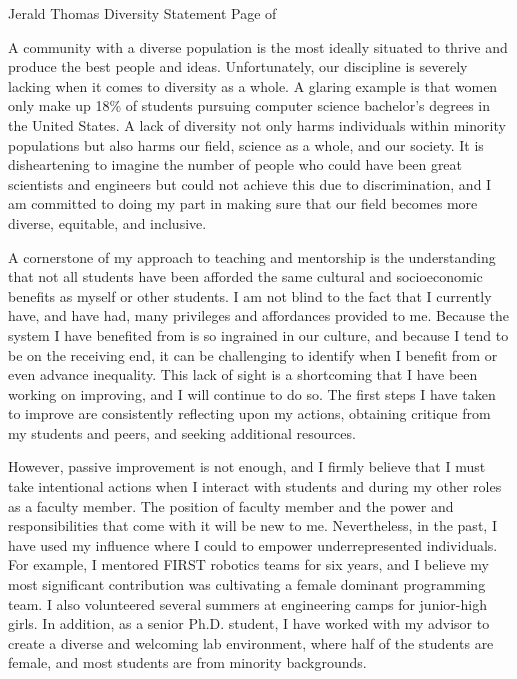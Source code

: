 \newpage

\setcounter{page}{1}
\makecvfooter
  {Jerald Thomas}
  {Diversity Statement}
  {Page \thepage \hspace{1pt} of \pageref{diversity_last}}

\makecvheader[C]
\doublespacing


A community with a diverse population is the most ideally situated to thrive and produce the best people and ideas. Unfortunately, our discipline is severely lacking when it comes to diversity as a whole. A glaring example is that women only make up 18\% of students pursuing computer science bachelor's degrees in the United States. A lack of diversity not only harms individuals within minority populations but also harms our field, science as a whole, and our society. It is disheartening to imagine the number of people who could have been great scientists and engineers but could not achieve this due to discrimination, and I am committed to doing my part in making sure that our field becomes more diverse, equitable, and inclusive.

A cornerstone of my approach to teaching and mentorship is the understanding that not all students have been afforded the same cultural and socioeconomic benefits as myself or other students. I am not blind to the fact that I currently have, and have had, many privileges and affordances provided to me. Because the system I have benefited from is so ingrained in our culture, and because I tend to be on the receiving end, it can be challenging to identify when I benefit from or even advance inequality. This lack of sight is a shortcoming that I have been working on improving, and I will continue to do so. The first steps I have taken to improve are consistently reflecting upon my actions, obtaining critique from my students and peers, and seeking additional resources.

However, passive improvement is not enough, and I firmly believe that I must take intentional actions when I interact with students and during my other roles as a faculty member. The position of faculty member and the power and responsibilities that come with it will be new to me. Nevertheless, in the past, I have used my influence where I could to empower underrepresented individuals. For example, I mentored FIRST robotics teams for six years, and I believe my most significant contribution was cultivating a female dominant programming team. I also volunteered several summers at engineering camps for junior-high girls. In addition, as a senior Ph.D. student, I have worked with my advisor to create a diverse and welcoming lab environment, where half of the students are female, and most students are from minority backgrounds.

